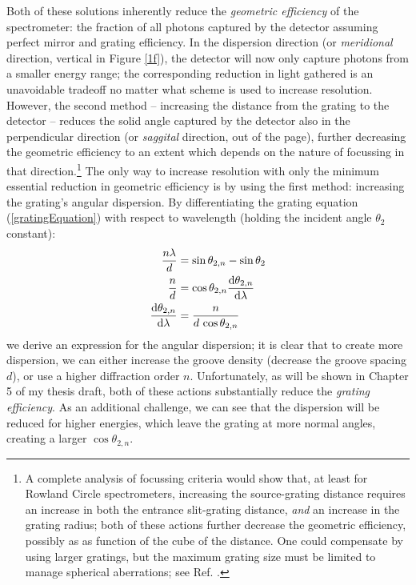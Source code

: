 Both of these solutions inherently reduce the \emph{geometric efficiency} of the spectrometer: the fraction of all photons captured by the detector assuming perfect mirror and grating efficiency.  In the dispersion direction (or \emph{meridional} direction, vertical in Figure \ref{1f}), the detector will now only capture photons from a smaller energy range; the corresponding reduction in light gathered is an unavoidable tradeoff no matter what scheme is used to increase  resolution.  However, the second method -- increasing the distance from the grating to the detector --  reduces the solid angle captured by the detector also in the perpendicular direction (or \emph{saggital} direction, out of the page), further decreasing the geometric efficiency to an extent which depends on the nature of focussing in that direction.\footnote{A complete analysis of focussing criteria would show that, at least for Rowland Circle spectrometers, increasing the source-grating distance requires an increase in both the entrance slit-grating distance, \emph{and} an increase in the grating radius; both of these actions further decrease the geometric efficiency, possibly as as function of the cube of the distance.  One could compensate by using larger gratings, but the maximum grating size must be limited to manage spherical aberrations; see Ref. \cite[p.~98]{Mui06}.}  The only way to increase resolution with only the minimum essential reduction in geometric efficiency is by using the first method: increasing the grating's angular dispersion.  By differentiating the grating equation (\ref{gratingEquation}) with respect to wavelength (holding the incident angle $\theta_{2}$ constant):
\begin{align}
\frac{n\lambda}{d} &= \sin\theta_{2,n} - \sin\theta_{2} \\
\frac{n}{d} &= \cos \theta_{2,n} \frac{\mathrm{d} \theta_{2,n}}{\mathrm{d} \lambda} \\
\frac{\mathrm{d} \theta_{2,n}}{\mathrm{d} \lambda} &= \frac{n}{d\, \cos \theta_{2,n}}
\label{angularDispersionEqn}
\end{align}
we derive an expression for the angular dispersion; it is clear that to create more dispersion, we can either increase the groove density (decrease the groove spacing $d$), or use a higher diffraction order $n$.  Unfortunately, as will be shown in Chapter 5 of my thesis draft, both of these actions substantially reduce the \emph{grating efficiency}.  As an additional challenge, we can see that the dispersion will be reduced for higher energies, which leave the grating at more normal angles, creating a larger $\cos \theta_{2,n}$.

